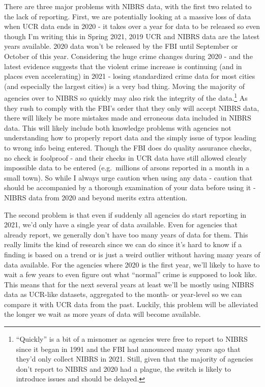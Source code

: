 \documentclass[
]{krantz}
\begin{document}
There are three major problems with NIBRS data, with the
first two related to the lack of reporting. First, we are
potentially looking at a massive loss of data when UCR data
ends in 2020 - it takes over a year for data to be released
so even though I'm writing this in Spring 2021, 2019 UCR and
NIBRS data are the latest years available. 2020 data won't
be released by the FBI until September or October of this
year. Considering the huge crime changes during 2020 - and
the latest evidence suggests that the violent crime increase
is continuing (and in places even accelerating) in 2021 -
losing standardized crime data for most cities (and
especially the largest cities) is a very bad thing. Moving
the majority of agencies over to NIBRS so quickly may also
risk the integrity of the data.\footnote{``Quickly'' is a
  bit of a misnomer as agencies were free to report to NIBRS
  since it began in 1991 and the FBI had announced many
  years ago that they'd only collect NIBRS in 2021. Still,
  given that the majority of agencies don't report to NIBRS
  and 2020 had a plague, the switch is likely to introduce
  issues and should be delayed.} As they rush to comply with
the FBI's order that they only will accept NIBRS data, there
will likely be more mistakes made and erroneous data
included in NIBRS data. This will likely include both
knowledge problems with agencies not understanding how to
properly report data and the simply issue of typos leading
to wrong info being entered. Though the FBI does do quality
assurance checks, no check is foolproof - and their checks
in UCR data have still allowed clearly impossible data to be
entered (e.g.~millions of arsons reported in a month in a
small town). So while I always urge caution when using any
data - caution that should be accompanied by a thorough
examination of your data before using it - NIBRS data from
2020 and beyond merits extra attention.

The second problem is that even if suddenly all agencies do
start reporting in 2021, we'd only have a single year of
data available. Even for agencies that already report, we
generally don't have too many years of data for them. This
really limits the kind of research since we can do since
it's hard to know if a finding is based on a trend or is
just a weird outlier without having many years of data
available. For the agencies where 2020 is the first year,
we'll likely to have to wait a few years to even figure out
what ``normal'' crime is supposed to look like. This means
that for the next several years at least we'll be mostly
using NIBRS data as UCR-like datasets, aggregated to the
month- or year-level so we can compare it with UCR data from
the past. Luckily, this problem will be alleviated the
longer we wait as more years of data will become available.
\end{document}
